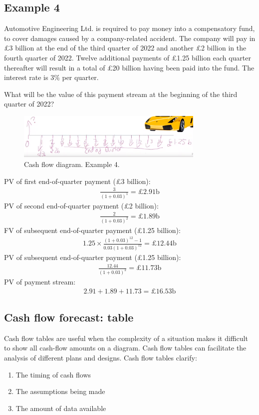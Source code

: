 \subsection{Example 4}
Automotive Engineering Ltd. is required to pay money into a compensatory fund, to cover damages caused by a company-related accident. The company will pay in \pounds 3 billion at the end of the third quarter of 2022 and another \pounds 2 billion in the fourth quarter of 2022. Twelve additional payments of \pounds 1.25 billion each quarter thereafter will result in a total of \pounds 20 billion having been paid into the fund. The interest rate is 3\% per quarter.
\begin{quoting}
    What will be the value of this payment stream at the beginning of the third quarter of 2022?
\end{quoting}
\begin{figure}[H]
    \centering
    \includegraphics[width = 0.8\textwidth]{img/figure57.png}
    \caption{Cash flow diagram. Example 4.}
\end{figure}
PV of first end-of-quarter payment (\pounds 3 billion):
\begin{gather}
    \frac{3}{\left(1+0.03\right)^1} = \pounds 2.91\textrm{b}
\end{gather}
PV of second end-of-quarter payment (\pounds 2 billion):
\begin{gather}
    \frac{2}{\left(1+0.03\right)^2} = \pounds 1.89\textrm{b}
\end{gather}
FV of subsequent end-of-quarter payment (\pounds 1.25 billion):
\begin{gather}
    1.25\times \frac{\left(1+0.03\right)^{12}-1}{0.03\left(1+0.03\right)^{12}} = \pounds 12.44\textrm{b}
\end{gather}
PV of subsequent end-of-quarter payment (\pounds 1.25 billion):
\begin{gather}
    \frac{12.44}{\left(1+0.03\right)^2} = \pounds 11.73\textrm{b}
\end{gather}
PV of payment stream:
\begin{gather}
    2.91 + 1.89 + 11.73 = \pounds 16.53\textrm{b}
\end{gather}
\subsection{Cash flow forecast: table}
Cash flow tables are useful when the complexity of a situation makes it difficult to show all cash-flow amounts on a diagram. Cash flow tables can facilitate the analysis of different plans and designs. Cash flow tables clarify:
\begin{enumerate}
    \item The timing of cash flows
    \item The assumptions being made
    \item The amount of data available
\end{enumerate}
